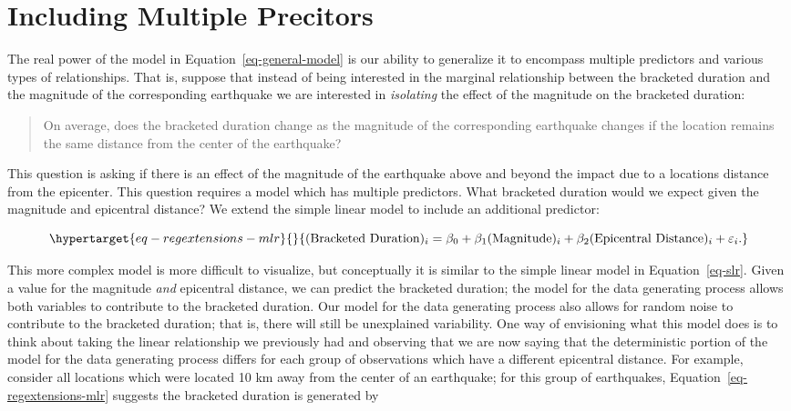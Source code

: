 \documentclass[
  letterpaper,
  DIV=11,
  numbers=noendperiod]{scrreprt}
\theoremstyle{definition}
\theoremstyle{definition}
\theoremstyle{plain}
\theoremstyle{remark}
\begin{document}
\hypertarget{including-multiple-precitors}{%
\section{Including Multiple
Precitors}\label{including-multiple-precitors}}

The real power of the model in Equation~\ref{eq-general-model} is our
ability to generalize it to encompass multiple predictors and various
types of relationships. That is, suppose that instead of being
interested in the marginal relationship between the bracketed duration
and the magnitude of the corresponding earthquake we are interested in
\emph{isolating} the effect of the magnitude on the bracketed duration:

\begin{quote}
On average, does the bracketed duration change as the magnitude of the
corresponding earthquake changes if the location remains the same
distance from the center of the earthquake?
\end{quote}

This question is asking if there is an effect of the magnitude of the
earthquake above and beyond the impact due to a locations distance from
the epicenter. This question requires a model which has multiple
predictors. What bracketed duration would we expect given the magnitude
and epicentral distance? We extend the simple linear model to include an
additional predictor:

\begin{equation}\protect\hypertarget{eq-regextensions-mlr}{}{(\text{Bracketed Duration})_i = \beta_0 + \beta_1(\text{Magnitude})_i + \beta_2(\text{Epicentral Distance})_i + \varepsilon_i.}\label{eq-regextensions-mlr}\end{equation}

This more complex model is more difficult to visualize, but conceptually
it is similar to the simple linear model in Equation~\ref{eq-slr}. Given
a value for the magnitude \emph{and} epicentral distance, we can predict
the bracketed duration; the model for the data generating process allows
both variables to contribute to the bracketed duration. Our model for
the data generating process also allows for random noise to contribute
to the bracketed duration; that is, there will still be unexplained
variability. One way of envisioning what this model does is to think
about taking the linear relationship we previously had and observing
that we are now saying that the deterministic portion of the model for
the data generating process differs for each group of observations which
have a different epicentral distance. For example, consider all
locations which were located 10 km away from the center of an
earthquake; for this group of earthquakes,
Equation~\ref{eq-regextensions-mlr} suggests the bracketed duration is
generated by
\end{document}
